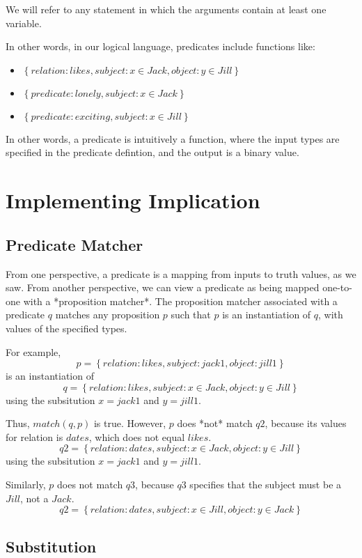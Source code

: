\documentclass[12pt]{article}
\begin{document}
We will refer to any statement in which the arguments contain at least one variable.

In other words, in our logical language, predicates include functions like:
\begin{itemize}
\item $\left\{relation:likes, subject:{x \in Jack}, object:{y \in Jill} \right\}$
\item $\left\{predicate:lonely, subject:{x \in Jack} \right\}$
\item $\left\{predicate:exciting, subject:{x \in Jill} \right\}$
\end{itemize}

In other words, a predicate is intuitively a function, where the input types are specified in the predicate defintion, and the output is a binary value.


\section{Implementing Implication}
\subsection{Predicate Matcher}
From one perspective, a predicate is a mapping from inputs to truth values, as we saw.
From another perspective, we can view a predicate as being mapped one-to-one with a *proposition matcher*.
The proposition matcher associated with a predicate $q$ matches any proposition $p$ such that $p$ is an instantiation of $q$, with values of the specified types.

For example, 
\[ p = \left\{relation:likes, subject:jack1, object:jill1 \right\} \]
is an instantiation of
\[ q = \left\{relation:likes, subject:{x \in Jack}, object:{y \in Jill} \right\} \]
using the subsitution $x=jack1$ and $y=jill1$.

Thus, $match(q, p)$ is true.
However, $p$ does *not* match $q2$, because its values for relation is $dates$, which does not equal $likes$.
\[ q2 = \left\{relation:dates, subject:{x \in Jack}, object:{y \in Jill} \right\} \]
using the subsitution $x=jack1$ and $y=jill1$.

Similarly, $p$ does not match $q3$, because $q3$ specifies that the subject must be a $Jill$, not a $Jack$.
\[ q2 = \left\{relation:dates, subject:{x \in Jill}, object:{y \in Jack} \right\} \]

\subsection{Substitution}
\end{document}
